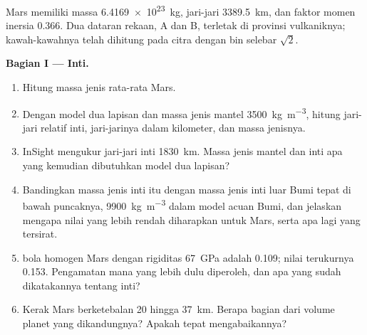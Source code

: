 \begin{problem}
\label{pb:b3:planetary-interiors-surfaces:1}
Mars memiliki massa \qty{6.4169e23}{kg}, jari-jari \qty{3389.5}{km}, dan
faktor momen inersia 0.366. Dua dataran rekaan, A dan B, terletak di
provinsi vulkaniknya; kawah-kawahnya telah dihitung pada citra dengan bin
selebar $\sqrt2$.

\medskip\noindent\textbf{Bagian I --- Inti.}
\begin{enumerate}
\item Hitung massa jenis rata-rata Mars.
\item Dengan model dua lapisan dan massa jenis mantel \qty{3500}{kg.m^{-3}}, hitung
  jari-jari relatif inti, jari-jarinya dalam kilometer, dan
  massa jenisnya.
\item InSight mengukur jari-jari inti \qty{1830}{km}. Massa jenis mantel dan inti apa
  yang kemudian dibutuhkan model dua lapisan?
\item Bandingkan massa jenis inti itu dengan massa jenis inti luar Bumi
  tepat di bawah puncaknya, \qty{9900}{kg.m^{-3}} dalam model acuan Bumi,
  dan jelaskan mengapa nilai yang lebih rendah diharapkan untuk Mars, serta apa lagi
  yang tersirat.
\item {} bola homogen Mars dengan rigiditas
  \qty{67}{GPa} adalah 0.109; nilai terukurnya 0.153. Pengamatan mana yang lebih dulu
  diperoleh, dan apa yang sudah dikatakannya tentang inti?
\item Kerak Mars berketebalan 20 hingga \qty{37}{km}. Berapa bagian dari
  volume planet yang dikandungnya? Apakah tepat mengabaikannya?
\end{enumerate}


\end{problem}
